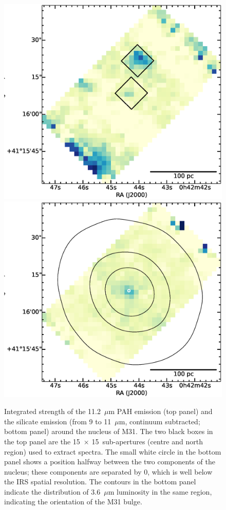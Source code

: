 \begin{figure}
\centering
\includegraphics[scale = 0.25]{./fig10a.eps}
\includegraphics[scale = 0.25]{./fig10b.eps}
\caption{
Integrated strength of the 11.2~$\mu$m PAH emission (top panel) and the silicate emission (from 9 to 11~$\mu$m, continuum subtracted; bottom panel) 
around the nucleus of M31. 
The  two black boxes in the top panel are the 15\arcsec\ $\times$ 15\arcsec\ sub-apertures (centre and north region) used to extract spectra.  
The small white circle in the bottom panel shows a position halfway between the two components of the nucleus; these
components are separated by 0, which is well below the IRS spatial resolution. The contours in the bottom panel indicate
the distribution of 3.6~$\mu$m luminosity in the same region, indicating the orientation of the M31 bulge.
}
\label{nuc11}
\end{figure}


